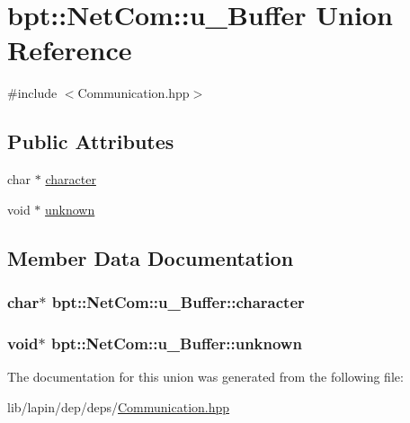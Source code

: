 \hypertarget{unionbpt_1_1_net_com_1_1u___buffer}{\section{bpt\-:\-:Net\-Com\-:\-:u\-\_\-\-Buffer Union Reference}
\label{unionbpt_1_1_net_com_1_1u___buffer}
}


{\ttfamily \#include $<$Communication.\-hpp$>$}

\subsection*{Public Attributes}
\begin{DoxyCompactItemize}
\item 
char $\ast$ \hyperlink{unionbpt_1_1_net_com_1_1u___buffer_a25d70c2608c0ff2813c5999797643acc}{character}
\item 
void $\ast$ \hyperlink{unionbpt_1_1_net_com_1_1u___buffer_aea8946e61efb15e1971fecd78e94ac85}{unknown}
\end{DoxyCompactItemize}


\subsection{Member Data Documentation}
\hypertarget{unionbpt_1_1_net_com_1_1u___buffer_a25d70c2608c0ff2813c5999797643acc}{
\subsubsection[{character}]{\setlength{\rightskip}{0pt plus 5cm}char$\ast$ bpt\-::\-Net\-Com\-::u\-\_\-\-Buffer\-::character}}\label{unionbpt_1_1_net_com_1_1u___buffer_a25d70c2608c0ff2813c5999797643acc}
\hypertarget{unionbpt_1_1_net_com_1_1u___buffer_aea8946e61efb15e1971fecd78e94ac85}{
\subsubsection[{unknown}]{\setlength{\rightskip}{0pt plus 5cm}void$\ast$ bpt\-::\-Net\-Com\-::u\-\_\-\-Buffer\-::unknown}}\label{unionbpt_1_1_net_com_1_1u___buffer_aea8946e61efb15e1971fecd78e94ac85}


The documentation for this union was generated from the following file\-:\begin{DoxyCompactItemize}
\item 
lib/lapin/dep/deps/\hyperlink{_communication_8hpp}{Communication.\-hpp}\end{DoxyCompactItemize}
